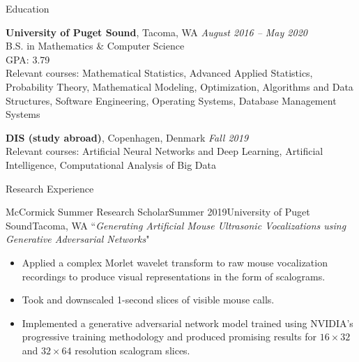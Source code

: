 \documentclass{resume} %
\begin{document}

\begin{rSection}{Education}

{\bf University of Puget Sound}, Tacoma, WA \hfill {\em August 2016 -- May 2020} \\ 
B.S. in Mathematics \& Computer Science \\
GPA: 3.79 \\
Relevant courses: Mathematical Statistics, Advanced Applied Statistics, Probability Theory, Mathematical Modeling, Optimization, Algorithms and Data Structures, Software Engineering, Operating Systems, Database Management Systems

{\bf DIS (study abroad)}, Copenhagen, Denmark \hfill {\em Fall 2019} \\
Relevant courses: Artificial Neural Networks and Deep Learning, Artificial Intelligence, Computational Analysis of Big Data

\end{rSection}



\begin{rSection}{Research Experience}

\begin{rSubsection}{McCormick Summer Research Scholar}{Summer 2019}{University of Puget Sound}{Tacoma, WA}
``\textit{Generating Artificial Mouse Ultrasonic Vocalizations using Generative Adversarial Networks}"
\renewcommand\labelitemi{$\cdot$}
\begin{itemize}
\setlength\itemsep{-0.25em}
\item Applied a complex Morlet wavelet transform to raw mouse vocalization recordings to produce visual representations in the form of scalograms.
\item Took and downscaled 1-second slices of visible mouse calls.
\item Implemented a generative adversarial network model trained using NVIDIA's progressive training methodology and produced promising results for $16 \times 32$ and $32 \times 64$ resolution scalogram slices.
\end{itemize}
\end{rSubsection}

\end{rSection}
\end{document}
